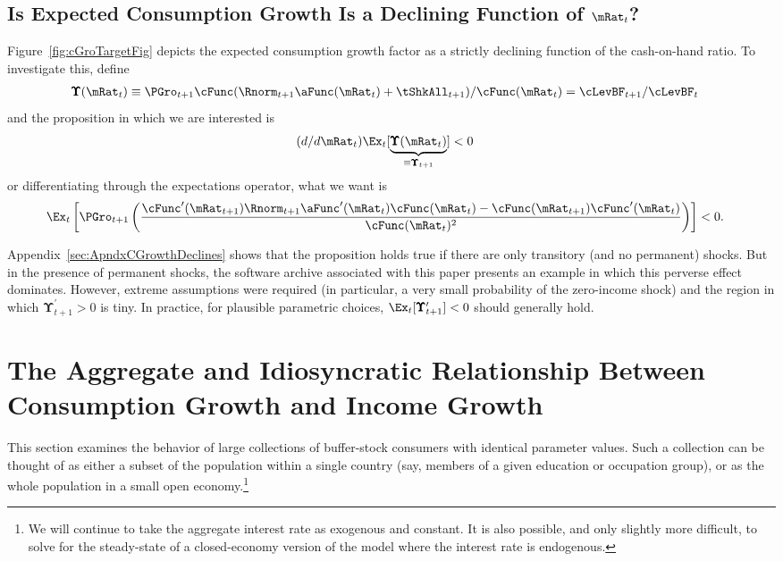 \documentclass[BufferStockTheory]{subfiles}
\begin{document}
\hypertarget{dcgdxneg}{}
\subsection{Is Expected Consumption Growth Is a Declining Function of $\mRat_{t}$?}
\label{subsec:dcgdxneg}

Figure~\ref{fig:cGroTargetFig} depicts the expected consumption growth factor as a strictly
declining function of the cash-on-hand ratio. To investigate this,
define
\begin{align*}
  \pmb{\Upsilon}(\mRat_{t})  & \equiv  \PGro_{t+1} \cFunc(\Rnorm_{t+1}\aFunc(\mRat_{t})+\tShkAll_{t+1})/\cFunc(\mRat_{t})  = \cLevBF_{t+1}/\cLevBF_{t}
\end{align*}
and the proposition in which we are interested is
\begin{align*}
  (d/d\mRat_{t})\Ex_{t}[\underbrace{\pmb{\Upsilon}(\mRat_{t})}_{\equiv \pmb{\Upsilon}_{t+1}}]  & < 0  
\end{align*}
or differentiating through the expectations operator, what we want is
\begin{align}
  \Ex_{t}\left[\PGro_{t+1} \left(\frac{\cFunc^{\prime}(\mRat_{t+1})\Rnorm_{t+1}\aFunc^{\prime}(\mRat_{t})\cFunc(\mRat_{t})-\cFunc(\mRat_{t+1})\cFunc^{\prime}(\mRat_{t})}{\cFunc(\mRat_{t})^{2}}\right)\right]  & < 0 \label{eq:kappaPrimeLT0}.
\end{align}

Appendix~\ref{sec:ApndxCGrowthDeclines} shows that the proposition holds true if there are only transitory (and no permanent) shocks.  But in the presence of permanent shocks, the software archive associated with this paper presents an example in which this perverse effect dominates.  However, extreme assumptions were required (in particular, a very small probability of the zero-income shock) and the region in which $\pmb{\Upsilon}_{t+1}^{\prime} > 0$ is tiny.  In practice, for plausible parametric choices, $\Ex_{t}[\pmb{\Upsilon}_{t+1}^{\prime}]<0$ should generally hold.


\hypertarget{The-Aggregate-and-Idiosyncratic-Relationship-Between-Consumption-Growth-and-Income-Growth}{}
\section{The Aggregate and Idiosyncratic Relationship Between
  Consumption Growth and Income Growth}

This section examines the behavior of large collections of buffer-stock consumers with identical parameter values. Such a collection can be thought of as either a subset of the population within a single country (say, members of a given education or occupation group), or as the whole population in a small open economy.\footnote{We will continue to take the aggregate interest rate as exogenous and constant. It is also possible, and only slightly more difficult, to solve for the steady-state of a closed-economy version of the model where the interest rate is endogenous.}
\end{document}
